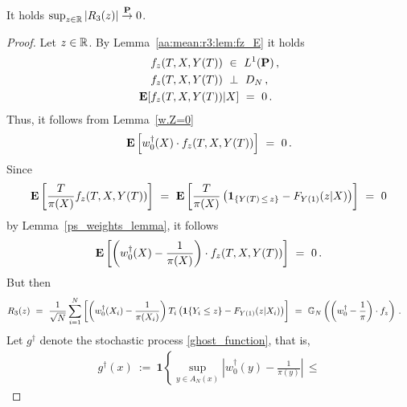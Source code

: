 \begin{lemma}
  \label{aa:mean:r3:lem:conv}
  It holds
  $\sup_{z\in\mathbb{R}}\left| R_3(z) \right|\overset{\mathbf{P}}{\to}0$.
\end{lemma}
\begin{proof}
  Let
  $z\in\mathbb{R}$.
    By Lemma~\ref{aa:mean:r3:lem:fz_E}
  it holds 
  \begin{align*}
    &
  f_z(T,X,Y(T))
  \ 
  \in
  \ 
  L^1(\P)\,, 
  \\
  &
  f_z(T,X,Y(T))
  \ 
  \perp
  \ 
  D_N
  \,,
  \\
  \E
  [
  &
  f_z(T,X,Y(T))
    |X
  ]
  \ 
  =
  \ 
  0
  \,.
  \end{align*}
  Thus, 
  it follows from Lemma~\ref{w.Z=0}
  \begin{gather*}
    \E
    \left[
      w_0^\dagger(X)
      \cdot
      f_z(T,X,Y(T))
    \right]
    \ 
    =
    \ 
    0
    \,.
  \end{gather*}
  Since
  \begin{gather*}
    \E
    \left[
      \frac{T}{\pi(X)}
      f_z(T,X,Y(T))
    \right]
    \ 
    =
    \ 
    \E
    \left[
      \frac{T}{\pi(X)}
      \left( 
        \mathbf{1}
        _{\left\{  Y(T)\,\le\,z \right\}}
        -
        F_{Y(1)}(z|X)
      \right)
    \right]
    \  
    =
    \ 
    0
  \end{gather*}
  by Lemma~\ref{ps_weights_lemma},
  it follows
  \begin{align*}
    \E
    \left[ 
      \left( 
      w_0^\dagger(X)
      -
      \frac{1}{\pi(X)}
      \right)
     \cdot
     f_z(T,X,Y(T))
    \right]
    \ 
    =
    \ 
  0
  \,.
  \end{align*}
  But then 
  \begin{align*}
    R_3(z)
    &
    \ 
    =
    \ 
  \frac{1}
  {
\sqrt{N}
  }
    \sum_{i=1}^{N} 
    \left[ 
    \left( 
    w_0^\dagger(X_i) 
    -
    \frac{1}{\pi(X_i)}
    \right)
    T_i
    \left( 
    \mathbf{1}{\left\{ Y_i \le z \right\}}
    -
  F_{Y(1)}(z|X_i)
    \right)
    \right]
    \ 
    =
    \ 
    \G_N
    \left( 
      \left( 
      w_0^\dagger
      -
      \frac{1}{\pi}
      \right)
     \cdot
     f_z
    \right)
    \,.
  \end{align*}
Let
  $g^\dagger$ 
  denote the stochastic process \eqref{ghost_function}, that is,
\begin{align*}
  g^\dagger
  (x)
  \ 
  :=
  \ 
  \mathbf{1}{
    \left\{ 
      \sup_{y\in A_N(x)}
      \left| 
      w_0^\dagger(y)
      -
      \frac{1}{\pi(y)}
      \right|
      \,
      \le
}
\end{align*}
\end{proof}
